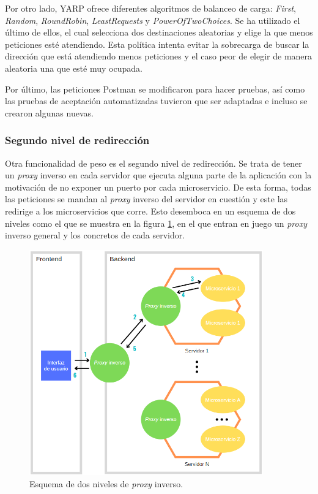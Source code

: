 \documentclass[11pt,spanish,listoffigures]{tfgetsinf}
\begin{document}
Por otro lado, YARP ofrece diferentes algoritmos de balanceo de carga: \emph{First}, \emph{Random}, \emph{RoundRobin}, \emph{LeastRequests} y \emph{PowerOfTwoChoices}. Se ha utilizado el último de ellos, el cual selecciona dos destinaciones aleatorias y elige la que menos peticiones esté atendiendo. Esta política intenta evitar la sobrecarga de buscar la dirección que está atendiendo menos peticiones y el caso peor de elegir de manera aleatoria una que esté muy ocupada.

Por último, las peticiones Postman se modificaron para hacer pruebas, así como las pruebas de aceptación automatizadas tuvieron que ser adaptadas e incluso se crearon algunas nuevas.


			\subsubsection{Segundo nivel de redirección}

Otra funcionalidad de peso es el segundo nivel de redirección. Se trata de tener un \emph{proxy} inverso en cada servidor que ejecuta alguna parte de la aplicación con la motivación de no exponer un puerto por cada microservicio. De esta forma, todas las peticiones se mandan al \emph{proxy} inverso del servidor en cuestión y este las redirige a los microservicios que corre. Esto desemboca en un esquema de dos niveles como el que se muestra en la figura \ref{esquemaProxyInversoDoble}, en el que entran en juego un \emph{proxy} inverso general y los concretos de cada servidor.

\begin{figure}[ht]
\centering
\includegraphics[width=0.9\textwidth]{imagenes/esquemaProxyInversoDoble}
\caption{Esquema de dos niveles de \emph{proxy} inverso.}
	\label{esquemaProxyInversoDoble}
\end{figure}
\end{document}
